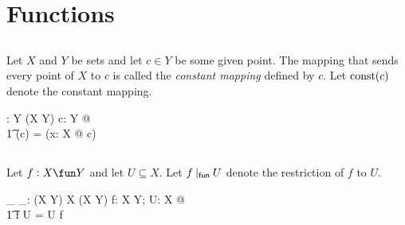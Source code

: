 \documentclass[11pt, oneside]{article}
\begin{document}
\section{Functions}


\subsection{}

Let $X$ and $Y$ be sets and let $c \in Y$ be some given point.
The mapping that sends every point of $X$ to $c$ is called the {\it constant mapping} defined by $c$.
Let $\operatorname{const}(c)$ denote the constant mapping.

\begin{gendef}[X,Y]
	\const: Y \fun (X \fun Y)
\where
	\forall c: Y @ \\
	\t1	\const(c) = (\lambda x: X @ c)
\end{gendef}


\subsection{}

Let $f: X \fun Y$ and let $U \subseteq X$.
Let $f \mathbin{|_{\mathsf{fun}}} U$ denote the restriction of $f$ to $U$.

\begin{gendef}[X,Y]
	\_ \restrictU \_: (X \fun Y) \cross \power X \fun (X \pfun Y)
\where
	\forall f: X \fun Y; U: \power X @ \\
	\t1	f \restrictU U = U \dres f
\end{gendef}

\printbibliography
\end{document}
